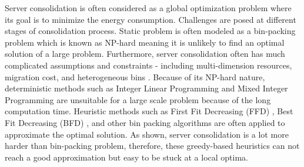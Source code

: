 


Server consolidation is often considered as 
a global optimization problem where its goal is to minimize the energy consumption.
Challenges are posed at different stages of consolidation process. 
Static problem is often modeled as a bin-packing problem  \cite{Mann:2015ua} 
which is known as NP-hard meaning it is unlikely to find an optimal solution 
of a large problem. 
Furthermore, server consolidation often has 
much complicated assumptions and constraints - including multi-dimension resources, 
migration cost, and heterogeneous bins \cite{Mann:2015ua}.
Because of its NP-hard nature, deterministic methods such as 
Integer Linear Programming \cite{Speitkamp:2010vp} and Mixed
Integer Programming \cite{} are unsuitable for a large scale problem 
because of the long computation time. 
Heuristic methods such as First Fit Decreasing (FFD) \cite{Panigrahy:2011wk}, 
Best Fit Decreasing (BFD) \cite{Xu:2010vh}, 
and other bin packing algorithms are often applied to approximate the optimal solution.
As \cite{Mann:2015ua} shown, server consolidation is a lot more harder than bin-packing problem,
therefore, these greedy-based heuristics can not reach a good approximation but easy to 
be stuck at a local optima.


